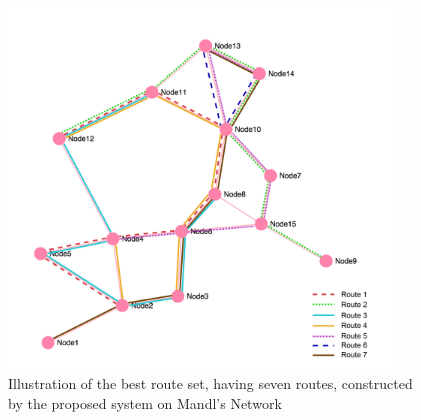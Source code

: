 \begin{figure}[H]
    \begin{center}
    \includegraphics[width=4in]{assets/mandlnetwork_7routes.png}
    \end{center}
    \caption{Illustration of the best route set, having seven routes, constructed by the proposed system on Mandl's Network}
    \label{fig:bestRouteSet7} 
\end{figure}

